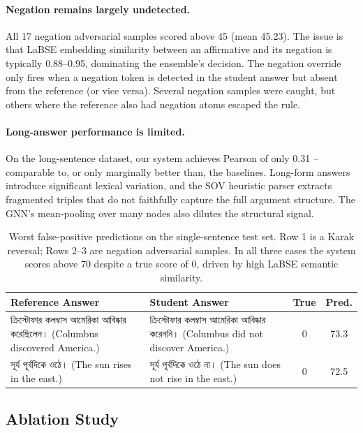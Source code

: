 \documentclass[11pt]{article}
\newcommand{\bn}[1]{{\bengalifont #1}}
\begin{document}
\paragraph{Negation remains largely undetected.} All 17 negation adversarial samples scored above 45 (mean 45.23). The issue is that LaBSE embedding similarity between an affirmative and its negation is typically 0.88--0.95, dominating the ensemble's decision. The negation override only fires when a negation token is detected in the student answer but absent from the reference (or vice versa). Several negation samples were caught, but others where the reference also had negation atoms escaped the rule.

\paragraph{Long-answer performance is limited.} On the long-sentence dataset, our system achieves Pearson of only 0.31 -- comparable to, or only marginally better than, the baselines. Long-form answers introduce significant lexical variation, and the SOV heuristic parser extracts fragmented triples that do not faithfully capture the full argument structure. The GNN's mean-pooling over many nodes also dilutes the structural signal.

\begin{table}[t]
  \centering
  \small
  \renewcommand{\arraystretch}{1.2}
  \begin{tabular}{p{5.5cm}p{5.5cm}cc}
    \toprule
    \textbf{Reference Answer} & \textbf{Student Answer} & \textbf{True} & \textbf{Pred.} \\
    \midrule
    \bn{ক্রিস্টোফার কলম্বাস আমেরিকা আবিষ্কার করেছিলেন।} (Columbus discovered America.) &
    \bn{ক্রিস্টোফার কলম্বাস আমেরিকা আবিষ্কার করেননি।} (Columbus did not discover America.) & 0 & 73.3 \\
    \midrule
    \bn{সূর্য পূর্বদিকে ওঠে।} (The sun rises in the east.) &
    \bn{সূর্য পূর্বদিকে ওঠে না।} (The sun does not rise in the east.) & 0 & 72.5 \\
    \bottomrule
  \end{tabular}
  \caption{Worst false-positive predictions on the single-sentence test set. Row 1 is a Karak reversal; Rows 2--3 are negation adversarial samples. In all three cases the system scores above 70 despite a true score of 0, driven by high LaBSE semantic similarity.}
  \label{tab:qual}
\end{table}

\subsection{Ablation Study}
\end{document}
